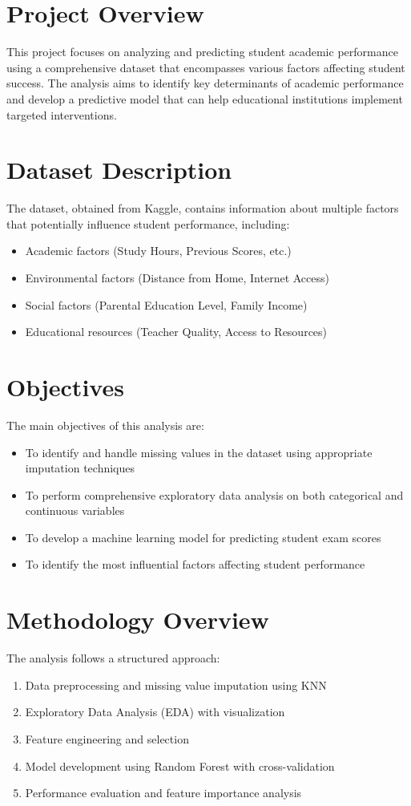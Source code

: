 \section{Project Overview}
This project focuses on analyzing and predicting student academic performance using a comprehensive dataset that encompasses various factors affecting student success. The analysis aims to identify key determinants of academic performance and develop a predictive model that can help educational institutions implement targeted interventions.

\section{Dataset Description}
The dataset, obtained from Kaggle, contains information about multiple factors that potentially influence student performance, including:
\begin{itemize}
    \item Academic factors (Study Hours, Previous Scores, etc.)
    \item Environmental factors (Distance from Home, Internet Access)
    \item Social factors (Parental Education Level, Family Income)
    \item Educational resources (Teacher Quality, Access to Resources)
\end{itemize}

\section{Objectives}
The main objectives of this analysis are:
\begin{itemize}
    \item To identify and handle missing values in the dataset using appropriate imputation techniques
    \item To perform comprehensive exploratory data analysis on both categorical and continuous variables
    \item To develop a machine learning model for predicting student exam scores
    \item To identify the most influential factors affecting student performance
\end{itemize}

\section{Methodology Overview}
The analysis follows a structured approach:
\begin{enumerate}
    \item Data preprocessing and missing value imputation using KNN
    \item Exploratory Data Analysis (EDA) with visualization
    \item Feature engineering and selection
    \item Model development using Random Forest with cross-validation
    \item Performance evaluation and feature importance analysis
\end{enumerate}